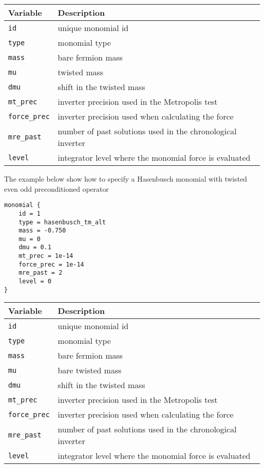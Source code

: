 \documentclass[12pt]{article}
\begin{document}
\vspace{2mm}

\begin{center}
\begin{tabular}{l|l}
 Variable & Description \\
 \hline
 \verb|id|         & unique monomial id \\
 \verb|type|       & monomial type \\
 \verb|mass|       & bare fermion mass \\
 \verb|mu|         & twisted mass \\
 \verb|dmu|        & shift in the twisted mass \\
 \verb|mt_prec|    & inverter precision used in the Metropolis test \\
 \verb|force_prec| & inverter precision used when calculating the force \\
 \verb|mre_past|   & number of past solutions used in the chronological inverter \\
 \verb|level|      & integrator level where the monomial force is evaluated
\end{tabular}
\end{center}

The example below show how to specify a Hasenbusch monomial with
twisted even odd preconditioned operator
\begin{center}
\begin{minipage}{55mm}
\begin{framed}
\begin{verbatim}
monomial {
    id = 1
    type = hasenbusch_tm_alt
    mass = -0.750
    mu = 0
    dmu = 0.1
    mt_prec = 1e-14
    force_prec = 1e-14
    mre_past = 2
    level = 0
}
\end{verbatim}
\vspace{-5mm}
\end{framed}
\end{minipage}
\end{center}

\vspace{2mm}

\begin{center}
\begin{tabular}{l|l}
 Variable & Description \\
 \hline
 \verb|id|         & unique monomial id \\
 \verb|type|       & monomial type \\
 \verb|mass|       & bare fermion mass \\
 \verb|mu|         & bare twisted mass \\
 \verb|dmu|        & shift in the twisted  mass \\
 \verb|mt_prec|    & inverter precision used in the Metropolis test \\
 \verb|force_prec| & inverter precision used when calculating the force \\
 \verb|mre_past|   & number of past solutions used in the chronological inverter \\
 \verb|level|      & integrator level where the monomial force is evaluated
\end{tabular}
\end{center}
\end{document}
